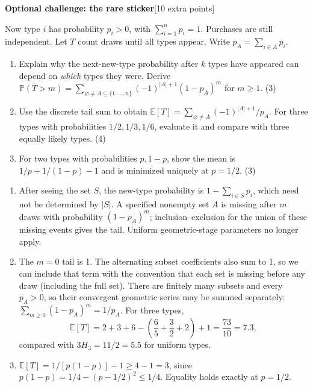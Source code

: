 \documentclass[11pt,letterpaper]{article}
\renewcommand{\P}{\mathbb P}
\newcommand{\E}{\mathbb E}
\newcommand{\pts}[1]{\hfill\textcolor{muted}{\small[#1 points]}}
\newcommand{\partpts}[1]{\unskip\nobreak\hspace{.3em}\mbox{\textcolor{muted}{\small(#1)}}}
\begin{document}
\par\addvspace{12pt}
{\bfseries\color{mint}Optional challenge: the rare sticker}\pts{10 extra}\par\nobreak
Now type $i$ has probability $p_i>0$, with $\sum_{i=1}^np_i=1$.
Purchases are still independent. Let $T$ count draws until all types appear.
Write $p_A=\sum_{i\in A}p_i$.
\begin{enumerate}
\item Explain why the next-new-type probability after $k$ types have
appeared can depend on \emph{which} types they were. Derive
$\P(T>m)=\sum_{\varnothing\ne A\subseteq\{1,\ldots,n\}}
(-1)^{|A|+1}(1-p_A)^m$ for $m\ge1$. \partpts{3}
\item Use the discrete tail sum to obtain
$\E[T]=\sum_{\varnothing\ne A}(-1)^{|A|+1}/p_A$.
For three types with probabilities $1/2,1/3,1/6$, evaluate it and
compare with three equally likely types. \partpts{4}
\item For two types with probabilities $p,1-p$, show the mean is
$1/p+1/(1-p)-1$ and is minimized uniquely at $p=1/2$. \partpts{3}
\end{enumerate}
\begin{solution}
\begin{enumerate}
\item After seeing the set $S$, the new-type probability is
$1-\sum_{i\in S}p_i$, which need not be determined by $|S|$.
A specified nonempty set $A$ is missing after $m$ draws with probability
$(1-p_A)^m$; inclusion--exclusion for the union of these missing events
gives the tail. Uniform geometric-stage parameters no longer apply.
\item The $m=0$ tail is 1. The alternating subset coefficients also sum
to 1, so we can include that term with the convention that each set is
missing before any draw (including the full set).
There are finitely many subsets and every $p_A>0$, so their convergent
geometric series may be summed separately:
$\sum_{m\ge0}(1-p_A)^m=1/p_A$.
For three types,
\[
\E[T]=2+3+6-\left(\frac65+\frac32+2\right)+1
=\frac{73}{10}=7.3,
\]
compared with $3H_3=11/2=5.5$ for uniform types.
\item $\E[T]=1/[p(1-p)]-1\ge4-1=3$, since
$p(1-p)=1/4-(p-1/2)^2\le1/4$. Equality holds exactly at $p=1/2$.
\end{enumerate}
\end{solution}
\end{document}
